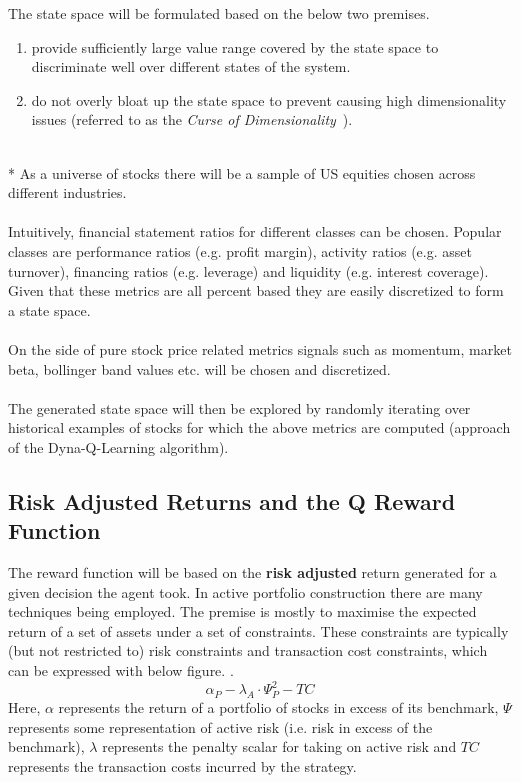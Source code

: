 \documentclass[dvips,12pt]{article}
\begin{document}
The state space will be formulated based on the below two premises.
\begin{enumerate}
	\item provide sufficiently large value range covered by the state space to discriminate well over different states of the system.
	\item do not overly bloat up the state space to prevent causing high dimensionality issues (referred to as the \emph{Curse of Dimensionality}~\cite{rojas2015}).
\end{enumerate}
~\\*
As a universe of stocks there will be a sample of US equities chosen across different industries.
\\\\
Intuitively, financial statement ratios for different classes can be chosen. Popular classes are performance ratios (e.g. profit margin), activity ratios (e.g. asset turnover), financing ratios (e.g. leverage) and liquidity (e.g. interest coverage). Given that these metrics are all percent based they are easily discretized to form a state space.
\\\\
On the side of pure stock price related metrics signals such as momentum, market beta, bollinger band values etc. will be chosen and discretized.
\\\\
The generated state space will then be explored by randomly iterating over historical examples of stocks for which the above metrics are computed (approach of the Dyna-Q-Learning algorithm). 

\subsection*{Risk Adjusted Returns and the Q Reward Function}
The reward function will be based on the \textbf{risk adjusted} return generated for a given decision the agent took.
In active portfolio construction there are many techniques being employed. The premise is mostly to maximise the expected return of a set of assets under a set of constraints. These constraints are typically (but not restricted to) risk constraints and transaction cost constraints, which can be expressed with below figure. \cite{grinoldkahn1999}.
\begin{equation}
	\alpha_P - \lambda_A \cdot \Psi_P^2 - TC
	\label{eq:max}
\end{equation}
Here, $\alpha$ represents the return of a portfolio of stocks in excess of its benchmark, $\Psi$ represents some representation of active risk (i.e. risk in excess of the benchmark), $\lambda$ represents the penalty scalar for taking on active risk and $TC$ represents the transaction costs incurred by the strategy.
\end{document}
